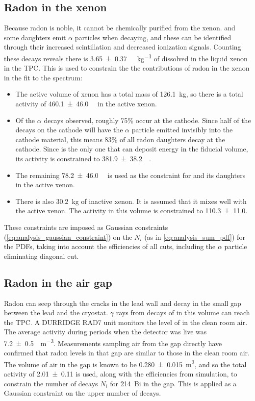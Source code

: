 \documentclass[herrin-thesis.tex]{subfiles}
\begin{document}
\subsection{Radon in the xenon}
Because radon is noble, it cannot be chemically purified from the xenon.  and some daughters emit \(\alpha\) particles when decaying, and these can be identified through their increased scintillation and decreased ionization signals. Counting these decays reveals there is \SI{3.65\pm0.37}{\micro\Bq\per\kg} of  dissolved in the liquid xenon in the TPC. This is used to constrain the the contributions of radon in the xenon in the fit to the spectrum:
\begin{itemize}
\item The active volume of xenon has a total mass of \SI{126.1}{\kg}, so there is a total activity of \SI{460.1\pm46.0}{\micro\Bq} in the active xenon.
\item Of the  \(\alpha\) decays observed, roughly 75\% occur at the cathode. Since half of the decays on the cathode will have the \(\alpha\) particle emitted invisibly into the cathode material, this means 83\% of all radon daughters decay at the cathode. Since  is the only one that can deposit energy in the fiducial volume, its activity is constrained to \SI{381.9\pm38.2}{\micro\Bq}.
\item The remaining \SI{78.2\pm46.0}{\micro\Bq} is used as the constraint for  and its daughters in the active xenon.
\item There is also \SI{30.2}{\kg} of inactive xenon. It is assumed that it mixes well with the active xenon. The activity in this volume is constrained to \SI{110.3\pm11.0}{\Bq}.
\end{itemize}
These constraints are imposed as Gaussian constraints (\cref{eq:analysis_gaussian_constraint}) on the \(N_i\) (as in \cref{eq:analysis_sum_pdf}) for the PDFs, taking into account the efficiencies of all cuts, including the \(\alpha\) particle eliminating diagonal cut.

\subsection{Radon in the air gap}
Radon can seep through the cracks in the lead wall and decay in the small gap between the lead and the cryostat. \(\gamma\) rays from decays of  in this volume can reach the TPC. A DURRIDGE RAD7 unit monitors the level of  in the clean room air. The average activity during periods when the detector was live was \SI{7.2\pm0.5}{\Bq\per\cubic\meter}. Measurements sampling air from the gap directly have confirmed that radon levels in that gap are similar to those in the clean room air. The volume of air in the gap is known to be \SI{.280\pm0.015}{\cubic\meter}, and so the total activity of \SI{2.01\pm 0.11}{\Bq} is used, along with the efficiencies from simulation, to constrain the number of decays \(N_i\) for \SI{214}{Bi} in the gap. This is applied as a Gaussian constraint on the upper number of decays.
\end{document}
